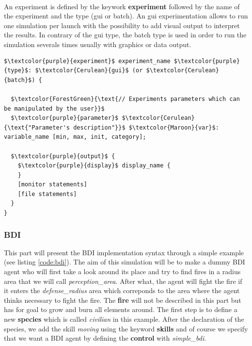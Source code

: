 \documentclass[12pt, a4paper]{memoir} %
\begin{document}
				\paragraph{}

				An experiment is defined by the keywork \textbf{experiment} followed by the name of the experiment and the type (gui or batch).
				An gui experimentation allows to run one simulation per launch with the possibility to add visual output to interpret the results.
				In contrary of the gui type, the batch type is used in order to run the simulation severals times usually with graphics or data output.

				\begin{lstlisting}[mathescape,caption=Experiment declaration.,label=code:experiment]
$\textcolor{purple}{experiment}$ experiment_name $\textcolor{purple}{type}$: $\textcolor{Cerulean}{gui}$ (or $\textcolor{Cerulean}{batch}$) {

  $\textcolor{ForestGreen}{\text{// Experiments parameters which can be manipulated by the user}}$
  $\textcolor{purple}{parameter}$ $\textcolor{Cerulean}{\text{"Parameter's description"}}$ $\textcolor{Maroon}{var}$: variable_name [min, max, init, category];

  $\textcolor{purple}{output}$ {
    $\textcolor{purple}{display}$ display_name {
    }
    [monitor statements]
    [file statements]
  }
}
				\end{lstlisting}

		\subsubsection{BDI}

			This part will present the BDI implementation syntax through a simple example (see listing \ref{code:bdi}).
			The aim of this simulation will be to make a dummy BDI agent who will first take a look around its place and try to find fires in a radius area
			that we will call \textit{perception\_area}. After what, the agent will fight the fire if it enters the \textit{defense\_radius} area which correponds
			to the area where the agent thinks necessary to fight the fire.
			The \textbf{fire} will not be described in this part but has for goal to grow and burn all elements around.
			The first step is to define a new \textbf{species} which is called \textit{civilian} in this example. After the declaration of the species, we add
			the skill \textit{moving} using the keyword \textbf{skills} and of course we specify that we want a BDI agent by defining the \textbf{control} with
			\textit{simple\_bdi}.
\end{document}
